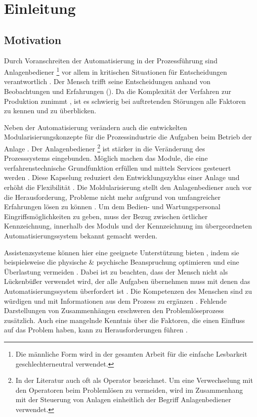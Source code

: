 
\chapter{Einleitung}
\label{sec:Einleitung}
\section{Motivation}
Durch Voranschreiten der Automatisierung in der Prozessführung sind Anlagenbediener \footnote{Die männliche Form wird in der gesamten Arbeit für die einfache Lesbarkeit geschlechterneutral verwendet.} vor allem in kritischen Situationen für Entscheidungen verantwortlich \cite{Bainbridge1983}. Der Mensch trifft seine Entscheidungen anhand von Beobachtungen und Erfahrungen (). Da die Komplexität der Verfahren zur Produktion zunimmt \cite{Poetter2007}, ist es schwierig bei auftretenden Störungen alle Faktoren zu kennen und zu überblicken. 

Neben der Automatisierung verändern auch die entwickelten Modularisierungskonzepte für die Prozessindustrie die Aufgaben beim Betrieb der Anlage \cite{Muller2017}. Der Anlagenbediener \footnote{In der Literatur auch oft als Operator bezeichnet. Um eine Verwechselung mit den Operatoren beim Problemlösen zu vermeiden, wird im Zusammenhang mit der Steuerung von Anlagen einheitlich der Begriff Anlagenbediener verwendet.} ist stärker in die Veränderung des Prozesssystems eingebunden. Möglich machen das Module, die eine verfahrenstechnische Grundfunktion erfüllen und mittels Services gesteuert werden \cite{Bloch2017}. Diese Kapselung reduziert den Entwicklungszyklus einer Anlage und erhöht die Flexibilität \cite{ZVEI2015}. Die Moldularisierung stellt den Anlagenbediener auch vor die Herausforderung, Probleme nicht mehr aufgrund von umfangreicher Erfahrungen  lösen zu können \cite{Muller2018}. \glqq Um dem Bedien- und Wartungspersonal Eingriffsmöglichkeiten zu geben, muss der Bezug zwischen örtlicher Kennzeichnung, innerhalb des Moduls und der Kennzeichnung im übergeordneten Automatisierungssystem bekannt gemacht werden.\grqq \ \citep[28]{Obst2013}

Assistenzsysteme können hier eine geeignete Unterstützung bieten \cite{Dalgleish2007}, indem sie beispielsweise die physische \& psychische Beanspruchung optimieren und eine Überlastung vermeiden \cite{Weisner2018}. Dabei ist zu beachten, dass der Mensch nicht als Lückenbüßer verwendet wird, der alle Aufgaben übernehmen muss mit denen das Automatisierungssystem überfordert ist \cite{Dalgleish2007}. Die Kompetenzen des Menschen sind zu würdigen und mit Informationen aus dem Prozess zu ergänzen \cite{Weisner2018}. Fehlende Darstellungen von Zusammenhängen erschweren den Problemlöseprozess zusätzlich. Auch eine mangelnde Kenntnis über die Faktoren, die einen Einfluss auf das Problem haben, kann zu Herausforderungen führen \cite{Herczeg2006} .

